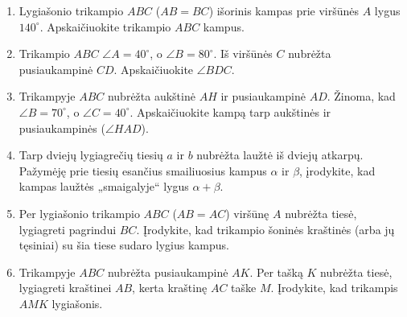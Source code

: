 \documentclass[11pt,a4paper]{scrartcl}
\begin{document}
\begin{enumerate}
    \renewcommand{\labelenumi}{\textbf{\theenumi.}}
    
    \item Lygiašonio trikampio $ABC$ ($AB=BC$) išorinis kampas prie viršūnės $A$ lygus $140^\circ$. Apskaičiuokite trikampio $ABC$ kampus.
    \item Trikampio $ABC$ $\angle A = 40^\circ$, o $\angle B = 80^\circ$. Iš viršūnės $C$ nubrėžta pusiaukampinė $CD$. Apskaičiuokite $\angle BDC$.
    \item Trikampyje $ABC$ nubrėžta aukštinė $AH$ ir pusiaukampinė $AD$. Žinoma, kad $\angle B = 70^\circ$, o $\angle C = 40^\circ$. Apskaičiuokite kampą tarp aukštinės ir pusiaukampinės ($\angle HAD$).
    
    \item Tarp dviejų lygiagrečių tiesių $a$ ir $b$ nubrėžta laužtė iš dviejų atkarpų. Pažymėję prie tiesių esančius smailiuosius kampus $\alpha$ ir $\beta$, įrodykite, kad kampas laužtės „smaigalyje“ lygus $\alpha + \beta$.
    \begin{center}
    \end{center}
    
    \item Per lygiašonio trikampio $ABC$ ($AB=AC$) viršūnę $A$ nubrėžta tiesė, lygiagreti pagrindui $BC$. Įrodykite, kad trikampio šoninės kraštinės (arba jų tęsiniai) su šia tiese sudaro lygius kampus.
    \item Trikampyje $ABC$ nubrėžta pusiaukampinė $AK$. Per tašką $K$ nubrėžta tiesė, lygiagreti kraštinei $AB$, kerta kraštinę $AC$ taške $M$. Įrodykite, kad trikampis $AMK$ lygiašonis.
    

\end{enumerate}
\end{document}
